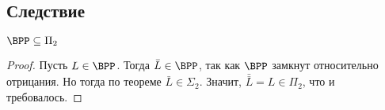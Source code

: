 \subsection{Следствие}
	\begin{conseq}
		$\BPP \subseteq \Pi_2$
	\end{conseq}
	\begin{proof}
		Пусть $L \in \BPP$.
		Тогда $\bar L \in \BPP$, так как $\BPP$ замкнут относительно отрицания.
		Но тогда по теореме $\bar L \in \Sigma_2$.
		Значит, $\bar{\bar L} = L \in \Pi_2$, что и требовалось.
	\end{proof}
